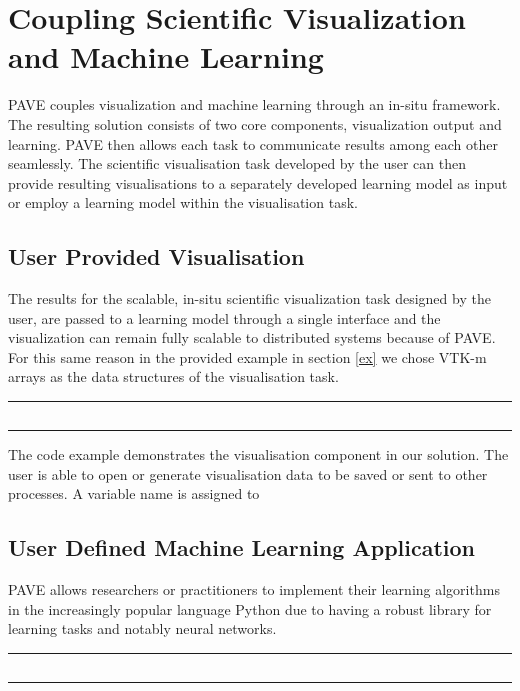 \section{Coupling Scientific Visualization and Machine Learning}
 
PAVE couples visualization and machine learning through an in-situ framework. The resulting solution consists of two core components, visualization output and learning. PAVE then allows each task to communicate results among each other seamlessly. The scientific visualisation task developed by the user can then provide resulting visualisations to a separately developed learning model as input or employ a learning model within the visualisation task.  
    
\subsection{User Provided Visualisation}

The results for the scalable, in-situ scientific visualization task designed by the user, are passed to a learning model through a single interface and the visualization can remain fully scalable to distributed systems because of PAVE. For this same reason in the provided example in section \ref{ex} we chose VTK-m arrays as the data structures of the visualisation task.

\noindent\rule{0.5\textwidth}{1pt}
\inputminted{cpp}{pave_pt.py}\label{PAVEvis}
\noindent\rule{0.5\textwidth}{1pt}

The code example  demonstrates the visualisation component in our solution. The user is able to open or generate visualisation data to be saved or sent to other processes. A variable name is assigned to 

\subsection{User Defined Machine Learning Application}

PAVE allows researchers or practitioners to implement their learning algorithms in the increasingly popular language Python due to having a robust library for learning tasks and notably neural networks. 

\noindent\rule{0.5\textwidth}{1pt}\label{PAVElearn}
\inputminted{python}{pave.py}
\noindent\rule{0.5\textwidth}{1pt}

